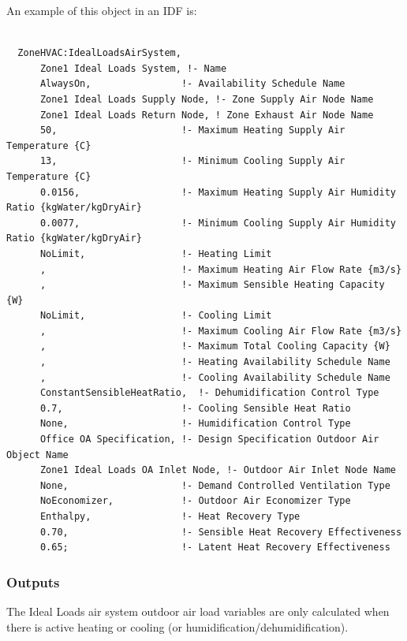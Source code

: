 An example of this object in an IDF is:

\begin{lstlisting}

  ZoneHVAC:IdealLoadsAirSystem,
      Zone1 Ideal Loads System, !- Name
      AlwaysOn,                !- Availability Schedule Name
      Zone1 Ideal Loads Supply Node, !- Zone Supply Air Node Name
      Zone1 Ideal Loads Return Node, ! Zone Exhaust Air Node Name
      50,                      !- Maximum Heating Supply Air Temperature {C}
      13,                      !- Minimum Cooling Supply Air Temperature {C}
      0.0156,                  !- Maximum Heating Supply Air Humidity Ratio {kgWater/kgDryAir}
      0.0077,                  !- Minimum Cooling Supply Air Humidity Ratio {kgWater/kgDryAir}
      NoLimit,                 !- Heating Limit
      ,                        !- Maximum Heating Air Flow Rate {m3/s}
      ,                        !- Maximum Sensible Heating Capacity {W}
      NoLimit,                 !- Cooling Limit
      ,                        !- Maximum Cooling Air Flow Rate {m3/s}
      ,                        !- Maximum Total Cooling Capacity {W}
      ,                        !- Heating Availability Schedule Name
      ,                        !- Cooling Availability Schedule Name
      ConstantSensibleHeatRatio,  !- Dehumidification Control Type
      0.7,                     !- Cooling Sensible Heat Ratio
      None,                    !- Humidification Control Type
      Office OA Specification, !- Design Specification Outdoor Air Object Name
      Zone1 Ideal Loads OA Inlet Node, !- Outdoor Air Inlet Node Name
      None,                    !- Demand Controlled Ventilation Type
      NoEconomizer,            !- Outdoor Air Economizer Type
      Enthalpy,                !- Heat Recovery Type
      0.70,                    !- Sensible Heat Recovery Effectiveness
      0.65;                    !- Latent Heat Recovery Effectiveness
\end{lstlisting}

\subsubsection{Outputs}\label{outputs-043}

The Ideal Loads air system outdoor air load variables are only calculated when there is active heating or cooling (or humidification/dehumidification).

